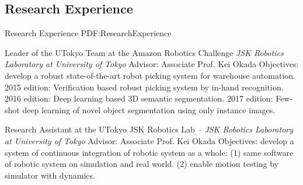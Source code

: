 \documentclass[letterpaper,MMMyyyy,nonstop]{simpleresumecv}
\begin{document}
\begin{body}
%
%


\section
{Research Experience}
{Research Experience}
{PDF:ResearchExperience}

Leader of the UTokyo Team at the Amazon Robotics Challenge
\hfill
{}
\newline
\textit{JSK Robotics Laboratory at University of Tokyo}
\newline
Advisor: Associate Prof. Kei Okada
\newline
Objectives: develop a robust state-of-the-art robot picking system for warehouse automation.
2015 edition: Verification based robust picking system by in-hand recognition.
2016 edition: Deep learning based 3D semantic segmentation.
2017 edition: Few-shot deep learning of novel object segmentation using only instance images.

\BigGapNoBreak

Research Assistant at the UTokyo JSK Robotics Lab
\hfill
\textit{ -- }
\newline
\textit{JSK Robotics Laboratory at University of Tokyo}
\newline
Advisor: Associate Prof. Kei Okada
\newline
Objectives: develop a system of continuous integration of robotic system as a whole:
(1) same software of robotic system on simulation and real world.
(2) enable motion testing by simulator with dynamics.


\end{body}
\end{document}
